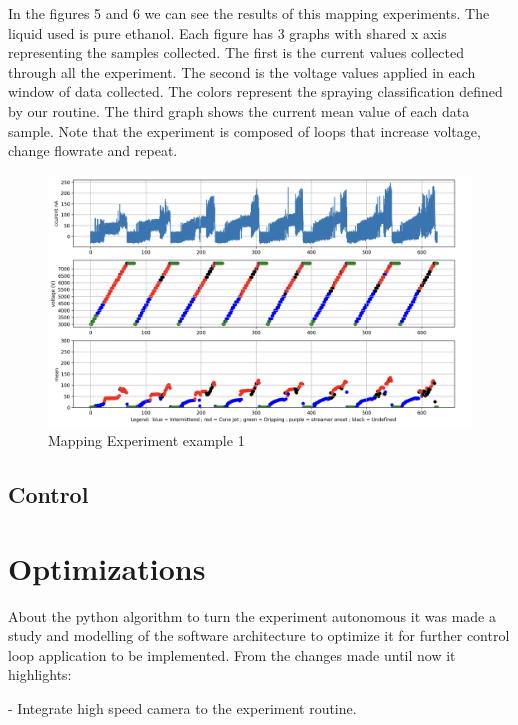     In the figures 5 and 6 we can see the results of this mapping experiments. The liquid used is pure ethanol. 
    Each figure has 3 graphs with shared x axis representing the samples collected. The first is the current values collected through all the experiment.
    The second is the voltage values applied in each window of data collected. The colors represent the spraying classification defined by our routine.
    The third graph shows the current mean value of each data sample.
    Note that the experiment is composed of loops that increase voltage, change flowrate and repeat.


    \begin{figure}[H]
        \center
        \includegraphics[width=15cm]{Metodology/Figuras/report2/map2Data.png}
        \caption{Mapping Experiment example 1 }
        \label{fig:map2Data_fig}
    \end{figure}



\subsection{Control}

\section{Optimizations}
\label{sec:routine_optimization}

About the python algorithm to turn the experiment autonomous it was made a study and modelling of the software architecture to optimize it for further control loop application to be implemented. From the changes made until now it highlights:

- Integrate high speed camera to the experiment routine.

